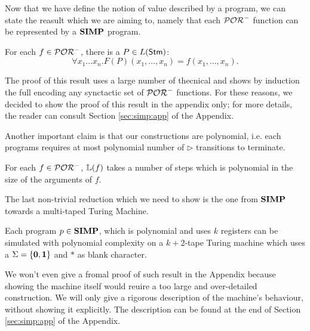 Now that we have define the notion of value described by a
program, we can state the reasult which we are aiming to,
namely that each $\mathcal{POR}^-$ function can be represented by a
$\mathbf{SIMP}$ program.












\begin{lemma}\label{lemma:implPOR-SIMP:main}
For each $f\in \mathcal{POR}^-$, there is a $P\in {L(\mathsf{Stm})}$:
$$
\forall x_1\dots x_n.F(P)(x_1,\dots, x_n) = f(x_1,\dots, x_n).
$$
\end{lemma}

The proof of this result uses a large number of
thecnical and shows by induction the full encoding any
synctactic set of $\mathcal{POR}^-$ functions. For these reasons, we decided
to show the proof of this result in the appendix only; for more details,
the reader can consult Section \ref{sec:simp:app} of the Appendix.

Another important claim is that our constructions are polynomial, i.e.
each programs requires at most polynomial number of $\triangleright$ transitions
to terminate.

\begin{prop}
For each $f \in \mathcal{POR}^-$, $\mathbb L(f)$ takes
a number of steps which
is polynomial in the size of the
arguments of $f$.
\end{prop}










The last non-trivial reduction which we need to show
is the one from $\mathbf{SIMP}$ towards a multi-taped Turing Machine.

\begin{prop}
\label{prop:simptm}
Each program $p\in \mathbf{SIMP}$,
which is polynomial and uses $k$ registers
can be simulated with polynomial complexity
on a $k+2$-tape Turing machine which
uses a {$\Sigma=\{\mathbf{0},\mathbf{1}\}$}
and $*$ as blank character.
\end{prop}

We won't even give a fromal proof of such result in the Appendix
because showing the machine itself would reuire a too large and
over-detailed construction.
We will only give a rigorous description
of the machine's behaviour, without showing it explicitly.
The description can be found
at the end of Section \ref{sec:simp:app} of the Appendix.









